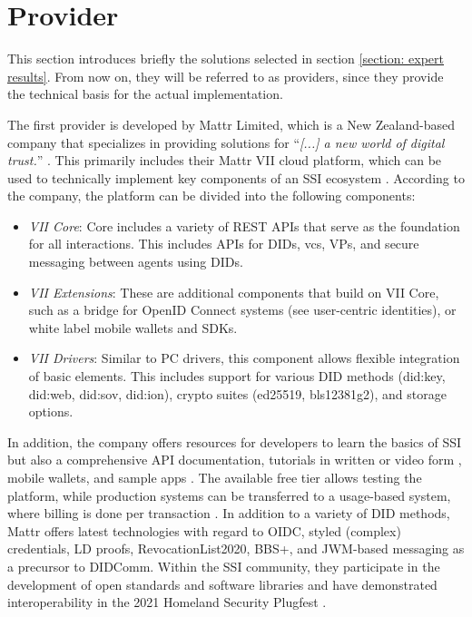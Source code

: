     \section{Provider}
    
    This section introduces briefly the solutions selected in section \ref{section: expert results}. From now on, they will be referred to as providers, since they provide the technical basis for the actual implementation.
    
    The first provider is developed by Mattr Limited, which is a New Zealand-based company \cite{Mattr_privacy_2021} that specializes in providing solutions for “\textit{[...] a new world of digital trust.}” \cite{Mattr_Mattr_2021-4}. This primarily includes their Mattr VII cloud platform, which can be used to technically implement key components of an \ac{SSI} ecosystem \cite{Mattr_products_2021}. According to the company, the platform can be divided into the following components: \cite{Mattr_Mattr_2021-2}

    \begin{itemize}
        \item \textit{VII Core}: Core includes a variety of REST APIs that serve as the foundation for all interactions. This includes APIs for \acp{DID}, \acp{vc}, \acp{VP}, and secure messaging between agents using \acp{DID}. \cite{Mattr_vii_2021}
        \item \textit{VII Extensions}: These are additional components that build on VII Core, such as a bridge for OpenID Connect systems (see user-centric identities), or white label mobile wallets and SDKs. \cite{Mattr_vii_2021-1}
        \item \textit{VII Drivers}: Similar to PC drivers, this component allows flexible integration of basic elements. This includes support for various DID methods (did:key, did:web, did:sov, did:ion), crypto suites (ed25519, bls12381g2)\cite{Mattr_vii_2021-2}, and storage options. \cite{Mattr_vii_2021-3}
    \end{itemize}
    
    In addition, the company offers resources for developers to learn the basics of SSI \cite{Mattr_resources_2021} but also a comprehensive API documentation, tutorials in written or video form \cite{Mattr_Mattr_2021}, mobile wallets, and sample apps \cite{Mattr_Mattr_2021-1, Mattr_vii_2021}. The available free tier allows testing the platform, while production systems can be transferred to a usage-based system, where billing is done per transaction \cite{Mattr_Mattr_2021-3}. In addition to a variety of \ac{DID} methods, Mattr offers latest technologies with regard to \ac{OIDC}, styled (complex) credentials, LD proofs, RevocationList2020, BBS+, and \ac{JWM}-based messaging as a precursor to DIDComm. Within the \ac{SSI} community, they participate in the development of open standards \cite{Mattr_approach_2021, looker_bbs_2021} and software libraries \cite{Mattr_Mattr_2021-5} and have demonstrated interoperability in the 2021 Homeland Security Plugfest  \cite{homeland_security_interoperability_2021}.
    
